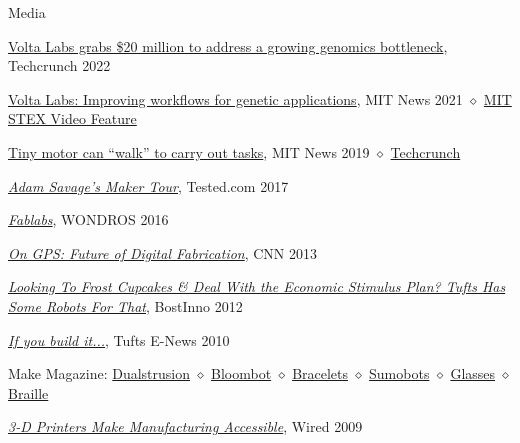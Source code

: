 \documentclass{resume} %
\begin{document}
\begin{rSection}{Media}

\href{https://techcrunch.com/2022/03/18/volta-labs-grabs-20-million-to-address-a-growing-genomics-bottleneck/}{Volta Labs grabs \$20 million to address a growing genomics bottleneck}, Techcrunch 2022

\href{https://news.mit.edu/2021/volta-labs-improving-workflows-genetic-applications-1014}{Volta Labs: Improving workflows for genetic applications}, MIT News 2021 $\diamond$ \href{https://startupexchange.mit.edu/watch/volta-labs}{MIT STEX Video Feature}

\href{https://news.mit.edu/2019/micro-robots-walk-0702}{Tiny motor can “walk” to carry out tasks}, MIT News 2019 $\diamond$ \href{https://techcrunch.com/2019/07/02/mit-develops-tiny-walking-motor-that-help-more-complex-robots-self-assemble/}{Techcrunch}

\href{https://www.youtube.com/watch?v=RaHMDNf56W4}{\em Adam Savage's Maker Tour}, Tested.com 2017

\href{https://vimeo.com/181328010}{\em Fablabs}, WONDROS 2016

\href{https://www.cnn.com/videos/bestoftv/2013/07/17/exp-gps-gershenfeld-3d-printing.cnn}{\em On GPS: Future of Digital Fabrication}, CNN 2013

\href{https://www.americaninno.com/boston/looking-to-frost-cupcakes-deal-with-the-economic-stimulus-plan-tufts-has-some-robots-for-that/}{\em Looking To Frost Cupcakes \& Deal With the Economic Stimulus Plan? Tufts Has Some Robots For That}, BostInno 2012

\href{https://web.archive.org/web/20120718010336/http://enews.tufts.edu/stories/1642/2010/03/31/WillLangford}{\em If you build it...}, Tufts E-News 2010


Make Magazine:
\href{https://makezine.com/2011/09/20/more-about-dualstrusion-from-makerbot/}{Dualstrusion} $\diamond$
\href{https://makezine.com/2010/04/16/hydroponic_herb_garden/}{Bloombot} $\diamond$
\href{https://makezine.com/2010/01/14/3d-printed-bracelet-of-the-future/}{Bracelets} $\diamond$
\href{https://makezine.com/2009/11/30/makerbot-sumobot/}{Sumobots} $\diamond$
\href{https://makezine.com/2009/07/14/print-your-own-glasses/}{Glasses} $\diamond$
\href{https://makezine.com/2009/09/21/printing-braille/}{Braille}

\href{https://www.wired.com/2009/08/makerbot/}{\em 3-D Printers Make Manufacturing Accessible}, Wired 2009

\end{rSection}
\end{document}
